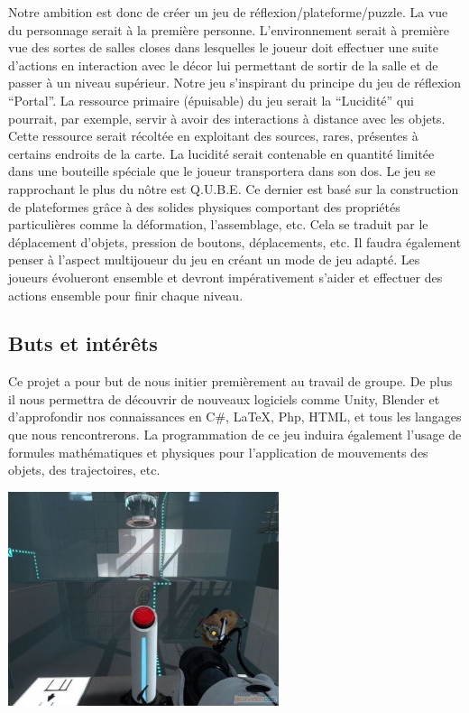 \documentclass[a4paper]{article}
\begin{document}
    Notre ambition est donc de créer un jeu de réflexion/plateforme/puzzle. La vue du personnage serait à la première personne. L’environnement serait à première vue des sortes de salles closes dans lesquelles le joueur doit effectuer une suite d’actions en interaction avec le décor lui permettant de sortir de la salle et de passer à un niveau supérieur. Notre jeu s'inspirant du principe du jeu de réflexion “Portal”. La ressource primaire (épuisable) du jeu serait la “Lucidité” qui pourrait, par exemple, servir à avoir des interactions à distance avec les objets. Cette ressource serait récoltée en exploitant des sources, rares, présentes à certains endroits de la carte. La lucidité serait contenable en quantité limitée dans une bouteille spéciale que le joueur transportera dans son dos. Le jeu se rapprochant le plus du nôtre est Q.U.B.E. Ce dernier est basé sur la construction de plateformes grâce à des solides physiques comportant des propriétés particulières comme la déformation, l’assemblage, etc.
Cela se traduit par le déplacement d’objets, pression de boutons, déplacements, etc. Il faudra également penser à l’aspect multijoueur du jeu en créant un mode de jeu adapté. Les joueurs évolueront ensemble et devront impérativement s’aider et effectuer des actions ensemble pour finir chaque niveau.

\newpage
 
	\subsection{Buts et intérêts}

    Ce projet a pour but de nous initier premièrement au travail de groupe. De plus il nous permettra de découvrir de nouveaux logiciels comme Unity, Blender et d’approfondir nos connaissances en C\#, LaTeX, Php, HTML, et tous les langages que nous rencontrerons.
La programmation de ce jeu induira également l’usage de formules mathématiques et physiques pour l’application de mouvements des objets, des trajectoires, etc.

\quad
\quad


\begin{centering}

\includegraphics[scale=1]{Portal2.jpg}

\end{centering}
\end{document}
